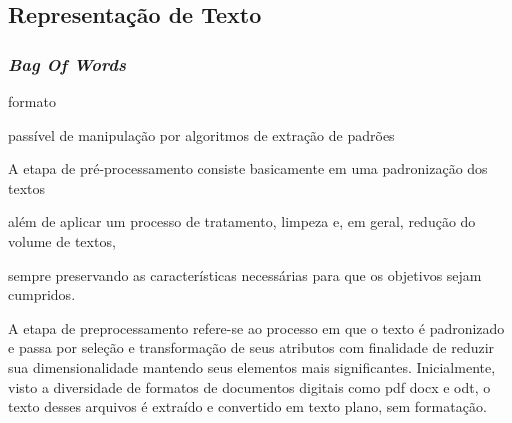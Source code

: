 






\subsection*{Representação de Texto}
\subsubsection*{\textit{Bag Of Words}}





formato 


passível de manipulação por algoritmos de extração de padrões 



A etapa de pré-processamento consiste basicamente em uma padronização dos textos 



além de aplicar um processo de tratamento, limpeza e, em geral, redução do
volume de textos, 


sempre preservando as características necessárias para que os objetivos
sejam cumpridos.




















A etapa de preprocessamento refere-se ao processo em que o texto é padronizado e passa por seleção e transformação de seus atributos com finalidade de reduzir sua dimensionalidade mantendo seus elementos mais significantes.
Inicialmente, visto a diversidade de formatos de documentos digitais como pdf docx e odt, o texto desses arquivos é extraído e convertido em texto plano, sem formatação.



